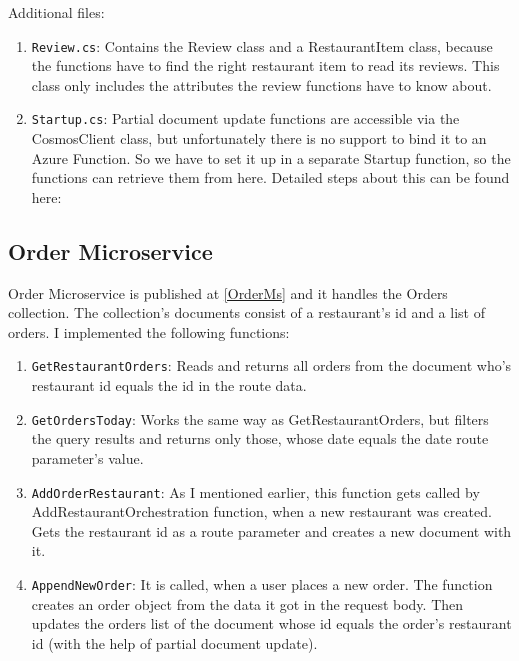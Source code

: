 Additional files: 

\begin{enumerate}
	\item \verb+Review.cs+: Contains the Review class and a RestaurantItem class, because the functions have to find the right restaurant item to read its reviews. This class only includes the attributes the review functions have to know about.
	
	\item \verb+Startup.cs+: Partial document update functions are accessible via the CosmosClient class, but unfortunately there is no support to bind it to an Azure Function. So we have to set it up in a separate Startup function, so the functions can retrieve them from here. Detailed steps about this can be found here: \cite{CosmosClient}
\end{enumerate}

\subsection{Order Microservice}\label{OrderMicroservice}

Order Microservice is published at \ref{OrderMs} and it handles the Orders collection. The collection's documents consist of a restaurant's id and a list of orders. 
I implemented the following functions:

\begin{enumerate}
	\item \verb+GetRestaurantOrders+: Reads and returns all orders from the document who's restaurant id equals the id in the route data. 
	
	\item \verb+GetOrdersToday+: Works the same way as GetRestaurantOrders, but filters the query results and returns only those, whose date equals the date route parameter's value.
	
	\item \verb+AddOrderRestaurant+: As I mentioned earlier, this function gets called by AddRestaurantOrchestration function, when a new restaurant was created. Gets the restaurant id as a route parameter and creates a new document with it. 
	
	\item \verb+AppendNewOrder+: It is called, when a user places a new order. The function creates an order object from the data it got in the request body. Then updates the orders list of the document whose id equals the order's restaurant id (with the help of partial document update).  

\end{enumerate}

